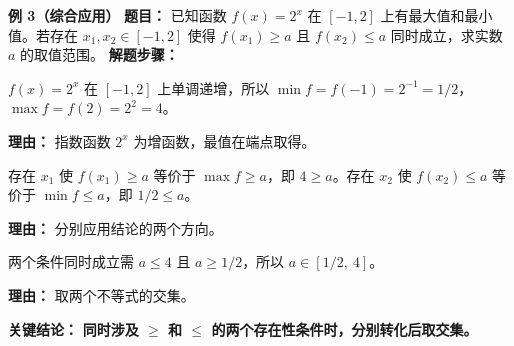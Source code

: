 \begin{examplebox}
	\medskip
	\textbf{\textcolor{CExample}{例 3（综合应用）}}
	\textbf{\textcolor{CExample}{题目：}}
	已知函数 $f(x)=2^x$ 在 $[-1,2]$ 上有最大值和最小值。若存在 $x_1,x_2\in[-1,2]$ 使得 $f(x_1)\ge a$ 且 $f(x_2)\le a$ 同时成立，求实数 $a$ 的取值范围。
	\textbf{\textcolor{CExample}{解题步骤：}}
	\begin{description}[style=nextline, leftmargin=2.8em, labelsep=0.5em, itemsep=0.45em]
		\item[\textbf{第一步（求最值）：}]
			$f(x)=2^x$ 在 $[-1,2]$ 上单调递增，所以 $\min f = f(-1)=2^{-1}=1/2$，$\max f = f(2)=2^{2}=4$。
			\par\textbf{理由：} 指数函数 $2^x$ 为增函数，最值在端点取得。
		\item[\textbf{第二步（转化两条件）：}]
			存在 $x_1$ 使 $f(x_1)\ge a$ 等价于 $\max f\ge a$，即 $4\ge a$。存在 $x_2$ 使 $f(x_2)\le a$ 等价于 $\min f\le a$，即 $1/2\le a$。
			\par\textbf{理由：} 分别应用结论的两个方向。
		\item[\textbf{第三步（求交集）：}]
			两个条件同时成立需 $a\le 4$ 且 $a\ge 1/2$，所以 $a\in[1/2,\ 4]$。
			\par\textbf{理由：} 取两个不等式的交集。
	\end{description}
	\textbf{\textcolor{CExample}{关键结论：}}
	\textbf{同时涉及 $\ge$ 和 $\le$ 的两个存在性条件时，分别转化后取交集。}
\end{examplebox}
